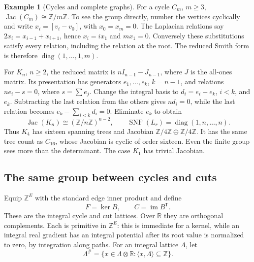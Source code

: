 \documentclass[11pt]{article}
\theoremstyle{definition}
\newtheorem{example}[theorem]{Example}
\theoremstyle{remark}
\newcommand{\Z}{\mathbb Z}
\newcommand{\R}{\mathbb R}
\begin{document}
\begin{example}[Cycles and complete graphs]
For a cycle \(C_m\), \(m\ge3\),
\(\operatorname{Jac}(C_m)\cong\Z/m\Z\).  To see the group directly,
number the vertices cyclically and write \(x_i=[v_i-v_0]\), with
\(x_0=x_m=0\).  The Laplacian relations say
\(2x_i=x_{i-1}+x_{i+1}\), hence \(x_i=ix_1\) and \(mx_1=0\).
Conversely these substitutions satisfy every relation, including the
relation at the root.  The reduced Smith form is therefore
\(\operatorname{diag}(1,\ldots,1,m)\).

For \(K_n\), \(n\ge2\), the reduced matrix is
\(nI_{n-1}-J_{n-1}\), where \(J\) is the all-ones matrix.  Its
presentation has generators \(e_1,\ldots,e_k\), \(k=n-1\), and relations
\(ne_i-s=0\), where \(s=\sum e_j\).  Change the integral basis to
\(d_i=e_i-e_k\), \(i<k\), and \(e_k\).  Subtracting the last relation
from the others gives \(nd_i=0\), while the last relation becomes
\(e_k-\sum_{i<k}d_i=0\).  Eliminate \(e_k\) to obtain
\[
 \operatorname{Jac}(K_n)\cong(\Z/n\Z)^{n-2},
 \qquad \operatorname{SNF}(L_r)=\operatorname{diag}(1,n,\ldots,n).
\]
Thus \(K_4\) has sixteen spanning trees and Jacobian
\(\Z/4\Z\oplus\Z/4\Z\).  It has the same tree count as \(C_{16}\),
whose Jacobian is cyclic of order sixteen.  Even the finite group sees
more than the determinant.  The case \(K_1\) has trivial Jacobian.
\end{example}

\subsection{The same group between cycles and cuts}

Equip \(\Z^E\) with the standard edge inner product and define
\[
 F=\ker B,\qquad C=\operatorname{im}B^{\mathsf T}.
\]
These are the integral cycle and cut lattices.  Over \(\R\) they are
orthogonal complements.  Each is primitive in \(\Z^E\): this is immediate
for a kernel, while an integral real gradient has an integral potential
after its root value is normalized to zero, by integration along paths.
For an integral lattice \(\Lambda\), let
\[
 \Lambda^\#=\{x\in\Lambda\otimes\R:
                 \langle x,\Lambda\rangle\subseteq\Z\}.
\]
\end{document}
